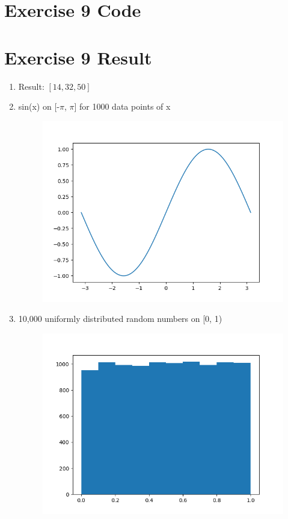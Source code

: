 \documentclass[11pt]{article}
\begin{document}
\section*{Exercise 9 Code}


\section*{Exercise 9 Result}
\begin{enumerate}[label=(\alph*)]
\item Result: $[14, 32, 50]$
\pagebreak
\item sin(x) on [-$\pi$, $\pi$] for 1000 data points of x
\begin{figure}[h!]
\includegraphics[width=0.7\linewidth]{figure9_b.png}
\end{figure}
\item 10,000 uniformly distributed random numbers on [0, 1)
\begin{figure}[h!]
\includegraphics[width=0.7\linewidth]{figure9_c.png}
\end{figure}
\end{enumerate}
\end{document}
